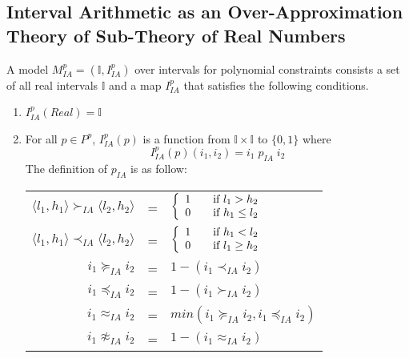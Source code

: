 \subsection{Interval Arithmetic as an Over-Approximation Theory of Sub-Theory of Real Numbers} \label{sec:Gen-IA}
\sloppy
A model $M^p_{IA} = (\mathbb{I}, I^p_{IA})$ over intervals for polynomial constraints consists a set of all real intervals $\mathbb{I}$ and a map $I^p_{IA}$ that satisfies the following conditions.
\begin{enumerate}
\item $I^p_{IA}(Real) = \mathbb{I}$
\item For all $p \in P^p$, $I^p_{IA}(p)$ is a function from $\mathbb{I}\times \mathbb{I}$ to $\{0, 1\}$ where \[I^p_{IA}(p)(i_1, i_2) = i_1 \; p_{IA} \; i_2\] The definition of $ p_{IA}$ is as follow:
\begin{center}
\begin{tabular} {r c l}
$\langle l_1, h_1\rangle  \succ_{IA} \langle l_2,  h_2\rangle$  &=& $\left\{ 
  \begin{array}{c l}
    1 & \quad \text{if } l_1 > h_2\\
    0 & \quad \text{if } h_1 \le l_2 \\
  \end{array} \right.$ \\
  
$\langle l_1, h_1\rangle  \prec_{IA} \langle l_2,  h_2\rangle$ & = & $\left\{ 
  \begin{array}{c l}
    1 & \quad \text{if } h_1 < l_2\\
    0 & \quad \text{if } l_1 \ge h_2 \\
  \end{array} \right.$\\
  
$i_1 \succeq_{IA} i_2$ &=& $1 - (i_1 \prec_{IA} i_2)$\\

$i_1 \preceq_{IA} i_2$ &=& $1 - (i_1 \succ_{IA} i_2)$ \\
$i_1 \approx_{IA} i_2 $ &=& $ min (i_1 \succeq_{IA} i_2, i_1 \preceq_{IA} i_2)$\\
$i_1 \not\approx_{IA} i_2 $ &=& $ 1 - (i_1 \approx_{IA} i_2)$
\end{tabular}
\end{center}


\end{enumerate}
